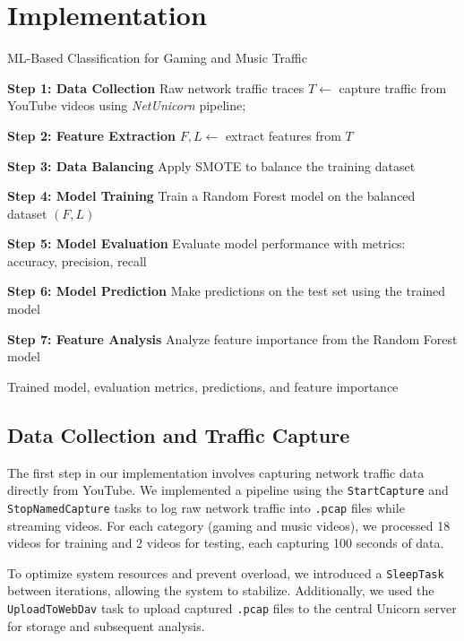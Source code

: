 \section{\mbox{Implementation}} \label{sec:implementation}

\begin{algorithm}[H] 
\caption{ML-Based Classification for Gaming and Music Traffic}
\label{algo:ml_pipeline}
\BlankLine
\textbf{Step 1: Data Collection}\;
Raw network traffic traces $T \gets$ capture traffic from YouTube videos using \emph{NetUnicorn} pipeline;

\textbf{Step 2: Feature Extraction}\;
$F, L \gets$ extract features from $T$\; 

\textbf{Step 3: Data Balancing}\;
Apply SMOTE to balance the training dataset\;

\textbf{Step 4: Model Training}\;
Train a Random Forest model on the balanced dataset $(F, L)$\;

\textbf{Step 5: Model Evaluation}\;
Evaluate model performance with metrics: accuracy, precision, recall\;

\textbf{Step 6: Model Prediction}\;
Make predictions on the test set using the trained model\;

\textbf{Step 7: Feature Analysis}\;
Analyze feature importance from the Random Forest model\;

\BlankLine
\Return Trained model, evaluation metrics, predictions, and feature importance\;
\end{algorithm}

\subsection{Data Collection and Traffic Capture}
The first step in our implementation involves capturing network traffic data directly from YouTube. We implemented a pipeline using the \texttt{StartCapture} and \texttt{StopNamedCapture} tasks to log raw network traffic into \texttt{.pcap} files while streaming videos. For each category (gaming and music videos), we processed 18 videos for training and 2 videos for testing, each capturing 100 seconds of data.

To optimize system resources and prevent overload, we introduced a \texttt{SleepTask} between iterations, allowing the system to stabilize. Additionally, we used the \texttt{UploadToWebDav} task to upload captured \texttt{.pcap} files to the central Unicorn server for storage and subsequent analysis.

